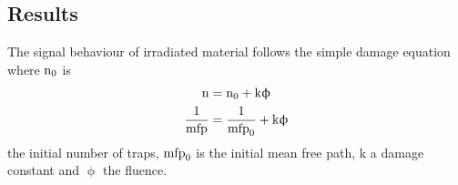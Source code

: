 
\subsection{Results}

The signal behaviour of irradiated material follows the simple damage equation where $\text{n}_0$ is
\begin{align}
	\text{n} 				&= \text{n}_0 + \text{k}\upphi\\
	\frac{1}{\text{mfp}}	&= \frac{1}{\text{mfp}_0} + \text{k}\upphi
\end{align}
 the initial number of traps, $\text{mfp}_0$ is the initial mean free path, k a damage constant and $\upphi$ the fluence.

